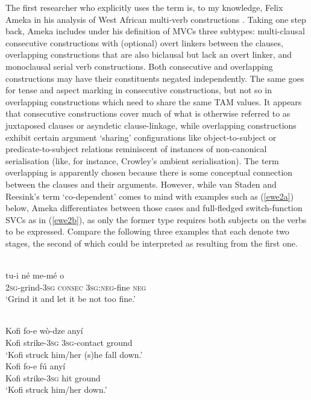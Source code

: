 The first researcher who explicitly uses the term is, to my knowledge, Felix Ameka in his analysis of West African multi-verb constructions \citep{ameka2005multiverb, ameka2006ewe}. Taking one step back, Ameka includes under his definition of MVCs three subtypes: multi-clausal consecutive constructions with (optional) overt linkers between the clauses, overlapping constructions that are also biclausal but lack an overt linker, and monoclausal serial verb constructions. Both consecutive and overlapping constructions may have their constituents negated independently. The same goes for tense and aspect marking in consecutive constructions, but not so in overlapping constructions which need to share the same TAM values. It appears that consecutive constructions cover much of what is otherwise referred to as juxtaposed clauses or asyndetic clause-linkage, while overlapping constructions exhibit certain argument `sharing' configurations like object-to-subject or predicate-to-subject relations reminiscent of instances of non-canonical serialisation (like, for instance, Crowley's ambient serialisation). The term overlapping is apparently chosen because there is some conceptual connection between the clauses and their arguments. However, while van Staden and Reesink's term `co-dependent' comes to mind with examples such as (\ref{ewe2a}) below, Ameka differentiates between those cases and full-fledged switch-function SVCs as in (\ref{ewe2b}), as only the former type requires both subjects on the verbs to be expressed. Compare the following three examples that each denote two stages, the second of which could be interpreted as resulting from the first one. 

\ea \label{ewe1} 
\\
\gll tu-i né me-mé o \\
\textsc{2}\textsc{sg}-grind-\textsc{3}\textsc{sg} \textsc{consec} \textsc{3}\textsc{sg}:\textsc{neg}-fine \textsc{neg} \\
\glft `Grind it and let it be not too fine.'\\ 
\z

\ea 
{}\\
\ea \label{ewe2a}
\gll Kofi fo-e wò-dze anyí \\
Kofi strike-\textsc{3}\textsc{sg} \textsc{3}\textsc{sg}-contact ground \\
\glft `Kofi struck him/her (s)he fall down.' \\ 
\ex \label{ewe2b}
\gll Kofi fo-e fú anyí \\ 
Kofi strike-\textsc{3}\textsc{sg} hit ground \\
\glft `Kofi struck him/her down.'\\ 
\z
\z

